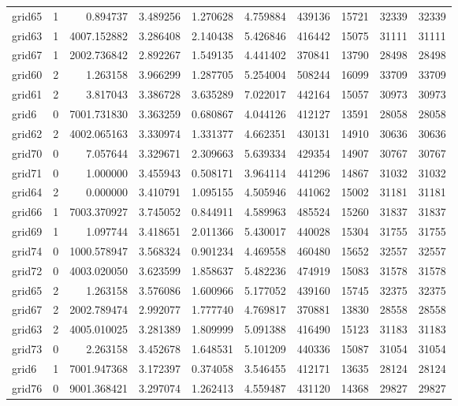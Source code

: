\documentclass[../../../thesis.tex]{subfiles}
\begin{document}
\begin{longtable}{|l|r|r|r|r|r|r|r|r|r|}
grid65 & 1 & 0.894737 & 3.489256 & 1.270628 & 4.759884 & 439136 & 15721 & 32339 & 32339 \\
grid63 & 1 & 4007.152882 & 3.286408 & 2.140438 & 5.426846 & 416442 & 15075 & 31111 & 31111 \\
grid67 & 1 & 2002.736842 & 2.892267 & 1.549135 & 4.441402 & 370841 & 13790 & 28498 & 28498 \\
grid60 & 2 & 1.263158 & 3.966299 & 1.287705 & 5.254004 & 508244 & 16099 & 33709 & 33709 \\
grid61 & 2 & 3.817043 & 3.386728 & 3.635289 & 7.022017 & 442164 & 15057 & 30973 & 30973 \\
grid6 & 0 & 7001.731830 & 3.363259 & 0.680867 & 4.044126 & 412127 & 13591 & 28058 & 28058 \\
grid62 & 2 & 4002.065163 & 3.330974 & 1.331377 & 4.662351 & 430131 & 14910 & 30636 & 30636 \\
grid70 & 0 & 7.057644 & 3.329671 & 2.309663 & 5.639334 & 429354 & 14907 & 30767 & 30767 \\
grid71 & 0 & 1.000000 & 3.455943 & 0.508171 & 3.964114 & 441296 & 14867 & 31032 & 31032 \\
grid64 & 2 & 0.000000 & 3.410791 & 1.095155 & 4.505946 & 441062 & 15002 & 31181 & 31181 \\
grid66 & 1 & 7003.370927 & 3.745052 & 0.844911 & 4.589963 & 485524 & 15260 & 31837 & 31837 \\
grid69 & 1 & 1.097744 & 3.418651 & 2.011366 & 5.430017 & 440028 & 15304 & 31755 & 31755 \\
grid74 & 0 & 1000.578947 & 3.568324 & 0.901234 & 4.469558 & 460480 & 15652 & 32557 & 32557 \\
grid72 & 0 & 4003.020050 & 3.623599 & 1.858637 & 5.482236 & 474919 & 15083 & 31578 & 31578 \\
grid65 & 2 & 1.263158 & 3.576086 & 1.600966 & 5.177052 & 439160 & 15745 & 32375 & 32375 \\
grid67 & 2 & 2002.789474 & 2.992077 & 1.777740 & 4.769817 & 370881 & 13830 & 28558 & 28558 \\
grid63 & 2 & 4005.010025 & 3.281389 & 1.809999 & 5.091388 & 416490 & 15123 & 31183 & 31183 \\
grid73 & 0 & 2.263158 & 3.452678 & 1.648531 & 5.101209 & 440336 & 15087 & 31054 & 31054 \\
grid6 & 1 & 7001.947368 & 3.172397 & 0.374058 & 3.546455 & 412171 & 13635 & 28124 & 28124 \\
grid76 & 0 & 9001.368421 & 3.297074 & 1.262413 & 4.559487 & 431120 & 14368 & 29827 & 29827 \\

\end{longtable}
\end{document}
